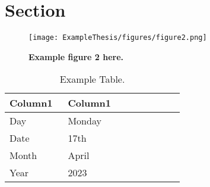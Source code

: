 \documentclass[../main.tex]{subfiles}
\begin{document}
\section{Section}
\lipsum[1]\citep{imambi2021pytorch}

\lipsum[2]

\lipsum[3]

\begin{figure}
\centering
 
  \texttt{[image: ExampleThesis/figures/figure2.png]}

  \caption[Example figure 2 here.]{\textbf{Example figure 2 here.} \lipsum[2]}
  
\end{figure}

\lipsum[4]

\begin{table}[ht]
    \centering
    \begin{tabular}{p{0.3\linewidth} | p{0.6\linewidth}}
    \hline 
        \textbf{Column1} & \textbf{Column1} \\\hline
        Day & Monday \\\hline 
        Date & 17th \\\hline 
        Month & April \\\hline 
        Year & 2023\\\hline 
    \end{tabular}
    \caption{Example Table.}
    \label{tab:table1}
\end{table}
\end{document}
